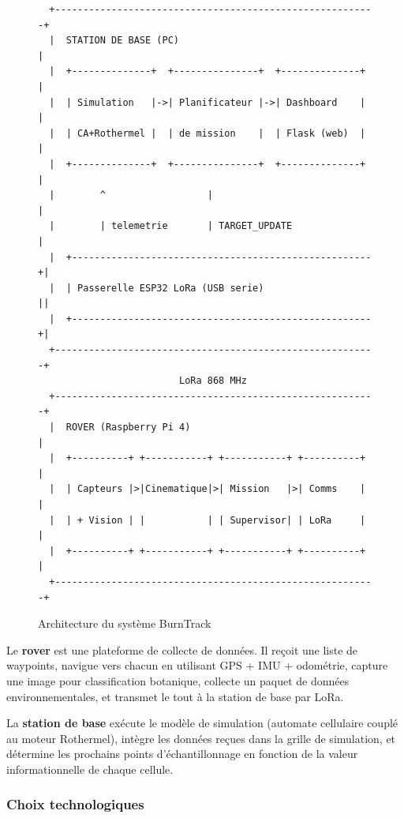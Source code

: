 \documentclass[a4paper,12pt,openany,titlepage]{scrartcl}
\begin{document}
\begin{figure}[H]
\centering
\begin{minipage}{0.95\textwidth}
\small
\begin{verbatim}
  +---------------------------------------------------------+
  |  STATION DE BASE (PC)                                   |
  |  +--------------+  +---------------+  +--------------+  |
  |  | Simulation   |->| Planificateur |->| Dashboard    |  |
  |  | CA+Rothermel |  | de mission    |  | Flask (web)  |  |
  |  +--------------+  +---------------+  +--------------+  |
  |        ^                  |                             |
  |        | telemetrie       | TARGET_UPDATE               |
  |  +-----------------------------------------------------+|
  |  | Passerelle ESP32 LoRa (USB serie)                   ||
  |  +-----------------------------------------------------+|
  +---------------------------------------------------------+
                         LoRa 868 MHz
  +---------------------------------------------------------+
  |  ROVER (Raspberry Pi 4)                                 |
  |  +----------+ +-----------+ +-----------+ +----------+  |
  |  | Capteurs |>|Cinematique|>| Mission   |>| Comms    |  |
  |  | + Vision | |           | | Supervisor| | LoRa     |  |
  |  +----------+ +-----------+ +-----------+ +----------+  |
  +---------------------------------------------------------+
\end{verbatim}
\end{minipage}
\caption{Architecture du système BurnTrack}
\label{fig:architecture}
\end{figure}

Le \textbf{rover} est une plateforme de collecte de données. Il reçoit une liste de waypoints, navigue vers chacun en utilisant GPS + IMU + odométrie, capture une image pour classification botanique, collecte un paquet de données environnementales, et transmet le tout à la station de base par LoRa.

La \textbf{station de base} exécute le modèle de simulation (automate cellulaire couplé au moteur Rothermel), intègre les données reçues dans la grille de simulation, et détermine les prochains points d'échantillonnage en fonction de la valeur informationnelle de chaque cellule.

\subsubsection{Choix technologiques}
\end{document}

